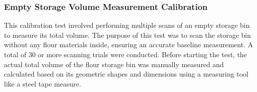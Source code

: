 
\subsubsection{Empty Storage Volume Measurement Calibration}
\label{ch3:subsubsec:empty-storage-volume-measurement-calibration}
This calibration test involved performing multiple scans of an empty storage bin to measure its total volume. The purpose of this test was to scan the storage bin without any flour materials inside, ensuring an accurate baseline measurement. A total of 30 or more scanning trials were conducted. Before starting the test, the actual total volume of the flour storage bin was manually measured and calculated based on its geometric shapes and dimensions using a measuring tool like a steel tape measure.





